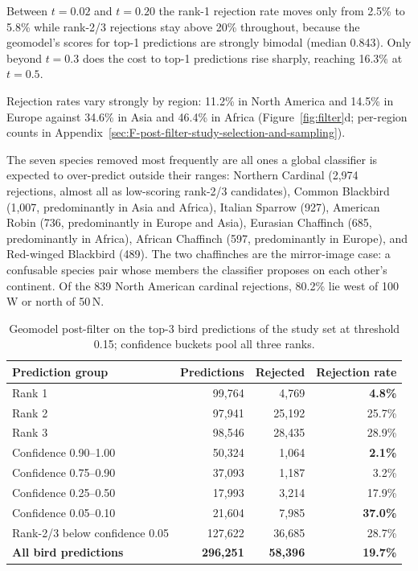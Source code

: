 Between $t = 0.02$ and $t = 0.20$ the rank-1 rejection rate moves only from 2.5\% to 5.8\% while rank-2/3 rejections stay above 20\% throughout, because the geomodel's scores for top-1 predictions are strongly bimodal (median 0.843). Only beyond $t = 0.3$ does the cost to top-1 predictions rise sharply, reaching 16.3\% at $t = 0.5$.

Rejection rates vary strongly by region: 11.2\% in North America and 14.5\% in Europe against 34.6\% in Asia and 46.4\% in Africa (Figure~\ref{fig:filter}d; per-region counts in Appendix~\ref{sec:F-post-filter-study-selection-and-sampling}).

The seven species removed most frequently are all ones a global classifier is expected to over-predict outside their ranges: Northern Cardinal (2,974 rejections, almost all as low-scoring rank-2/3 candidates), Common Blackbird (1,007, predominantly in Asia and Africa), Italian Sparrow (927), American Robin (736, predominantly in Europe and Asia), Eurasian Chaffinch (685, predominantly in Africa), African Chaffinch (597, predominantly in Europe), and Red-winged Blackbird (489). The two chaffinches are the mirror-image case: a confusable species pair whose members the classifier proposes on each other's continent. Of the 839 North American cardinal rejections, 80.2\% lie west of 100\textdegree{}\,W or north of 50\textdegree{}\,N.

\begin{table}[!ht]
\centering
\caption{Geomodel post-filter on the top-3 bird predictions of the study set at threshold 0.15; confidence buckets pool all three ranks.}
\label{tab:filter}
\small
\begin{tabular}{lrrr}
\toprule
Prediction group & Predictions & Rejected & Rejection rate \\
\midrule
Rank 1 & 99,764 & 4,769 & \textbf{4.8\%} \\
Rank 2 & 97,941 & 25,192 & 25.7\% \\
Rank 3 & 98,546 & 28,435 & 28.9\% \\
Confidence 0.90--1.00 & 50,324 & 1,064 & \textbf{2.1\%} \\
Confidence 0.75--0.90 & 37,093 & 1,187 & 3.2\% \\
Confidence 0.25--0.50 & 17,993 & 3,214 & 17.9\% \\
Confidence 0.05--0.10 & 21,604 & 7,985 & \textbf{37.0\%} \\
Rank-2/3 below confidence 0.05 & 127,622 & 36,685 & 28.7\% \\
\textbf{All bird predictions} & \textbf{296,251} & \textbf{58,396} & \textbf{19.7\%} \\
\bottomrule
\end{tabular}
\end{table}

